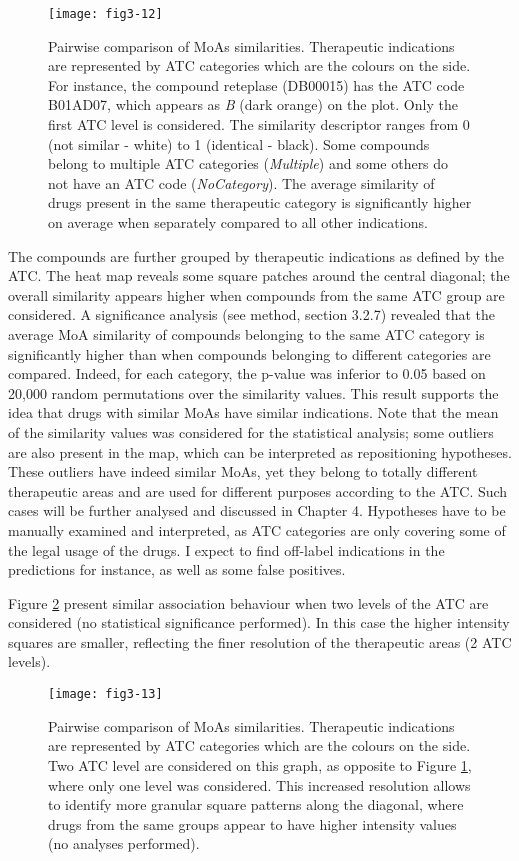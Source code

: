 \begin{figure}[H]
    \centering
    \texttt{[image: fig3-12]}
    \caption{Pairwise comparison of MoAs similarities. Therapeutic indications are represented by ATC categories which are the colours on the side. For instance, the compound reteplase (DB00015) has the ATC code B01AD07, 
which appears as \emph{B} (dark orange) on the plot. Only the first ATC level is considered. The similarity descriptor ranges from 0 (not similar - white) to 1 (identical - black). Some compounds belong to multiple ATC categories (\emph{Multiple}) and some others do not have an ATC code (\emph{NoCategory}). The average similarity of drugs present in the same therapeutic category is significantly higher on average when separately compared to all other indications.}
    \label{fig3-12}
\end{figure}

The compounds are further grouped by therapeutic indications as defined by the ATC. The heat map reveals some square patches around the central diagonal; the overall similarity appears higher when compounds from the same ATC group are considered. A significance analysis (see method, section 3.2.7) revealed that the average MoA similarity of compounds belonging to the same ATC category is significantly higher than when compounds belonging to different categories are compared. Indeed, for each category, the p-value was inferior to 0.05 based on 20,000 random permutations over the similarity values. This result supports the idea that drugs with similar MoAs have similar indications. Note that the mean of the similarity values was considered for the statistical analysis; some outliers are also present in the map, which can be interpreted as repositioning hypotheses. These outliers have indeed similar MoAs, yet they belong to totally different therapeutic areas and are used for different purposes according to the ATC. Such cases will be further analysed and discussed in Chapter 4. Hypotheses have to be manually examined and interpreted, as ATC categories are only covering some of the legal usage of the drugs. I expect to find off-label indications in the predictions for instance, as well as some false positives.

Figure \ref{fig3-13} present similar association behaviour when two levels of the ATC are considered (no statistical significance performed). In this case the higher intensity squares are smaller, reflecting the finer resolution of the therapeutic areas (2 ATC levels).

\begin{figure}[H]
    \centering
    \texttt{[image: fig3-13]}
    \caption{Pairwise comparison of MoAs similarities. Therapeutic indications are represented by ATC categories which are the colours on the side. Two ATC level are considered on this graph, as opposite to Figure \ref{fig3-12}, where only one level was considered. This increased resolution allows to identify more granular square patterns along the diagonal, where drugs from the same groups appear to have higher intensity values (no analyses performed).}
    \label{fig3-13}
\end{figure}

